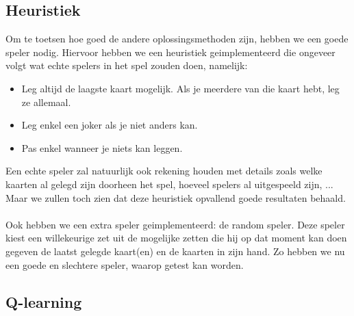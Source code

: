 \documentclass[11pt]{article}
\begin{document}
\subsection{Heuristiek}

Om te toetsen hoe goed de andere oplossingsmethoden zijn, hebben we een goede speler nodig. Hiervoor hebben we een heuristiek geimplementeerd die ongeveer volgt wat echte spelers in het spel zouden doen, namelijk:\\
\begin{itemize}
	\item Leg altijd de laagste kaart mogelijk. Als je meerdere van die kaart hebt, leg ze allemaal.
	\item Leg enkel een joker als je niet anders kan.
	\item Pas enkel wanneer je niets kan leggen.
\end{itemize}
Een echte speler zal natuurlijk ook rekening houden met details zoals welke kaarten al gelegd zijn doorheen het spel, hoeveel spelers al uitgespeeld zijn, ... Maar we zullen toch zien dat deze heuristiek opvallend goede resultaten behaald. \\\\
Ook hebben we een extra speler geimplementeerd: de random speler. Deze speler kiest een willekeurige zet uit de mogelijke zetten die hij op dat moment kan doen gegeven de laatst gelegde kaart(en) en de kaarten in zijn hand. Zo hebben we nu een goede en slechtere speler, waarop getest kan worden.\\

\subsection{Q-learning}
\end{document}
